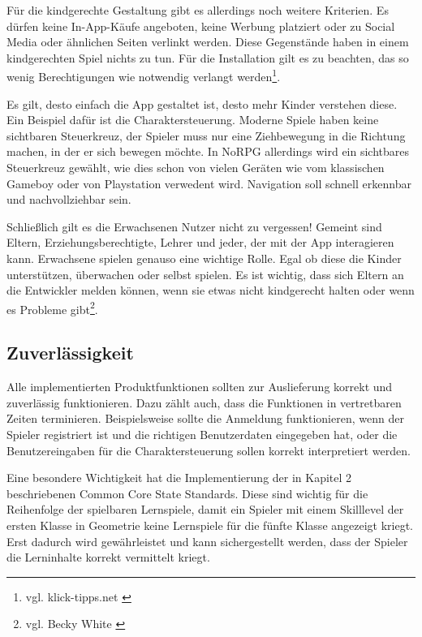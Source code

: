 		Für die kindgerechte Gestaltung gibt es allerdings noch weitere Kriterien. Es dürfen keine In-App-Käufe angeboten, keine Werbung platziert oder zu Social Media oder ähnlichen Seiten verlinkt werden. Diese Gegenstände haben in einem kindgerechten Spiel nichts zu tun. Für die Installation gilt es zu beachten, das so wenig Berechtigungen wie notwendig verlangt werden\footnote{vgl. klick-tipps.net \cite{appsforkids}}.
		
		Es gilt, desto einfach die App gestaltet ist, desto mehr Kinder verstehen diese. Ein Beispiel dafür ist die Charaktersteuerung. Moderne Spiele haben keine sichtbaren Steuerkreuz, der Spieler muss nur eine Ziehbewegung in die Richtung machen, in der er sich bewegen möchte. In NoRPG allerdings wird ein sichtbares Steuerkreuz gewählt, wie dies schon von vielen Geräten wie vom klassischen Gameboy oder von Playstation verwedent wird. Navigation soll schnell erkennbar und nachvollziehbar sein.
		
		Schließlich gilt es die Erwachsenen Nutzer nicht zu vergessen! Gemeint sind Eltern, Erziehungsberechtigte, Lehrer und jeder, der mit der App interagieren kann. Erwachsene spielen genauso eine wichtige Rolle. Egal ob diese die Kinder unterstützen, überwachen oder selbst spielen. Es ist wichtig, dass sich Eltern an die Entwickler melden können, wenn sie etwas nicht kindgerecht halten oder wenn es Probleme gibt\footnote{vgl. Becky White \cite{smashMagazin}}.	

	\subsection{Zuverlässigkeit}
		Alle implementierten Produktfunktionen sollten zur Auslieferung korrekt und zuverlässig funktionieren. Dazu zählt auch, dass die Funktionen in vertretbaren Zeiten terminieren. Beispielsweise sollte die Anmeldung funktionieren, wenn der Spieler registriert ist und die richtigen Benutzerdaten eingegeben hat, oder die Benutzereingaben für die Charaktersteuerung sollen korrekt interpretiert werden.
		
		Eine besondere Wichtigkeit hat die Implementierung der in Kapitel 2 beschriebenen Common Core State Standards. Diese sind wichtig für die Reihenfolge der spielbaren Lernspiele, damit ein Spieler mit einem Skilllevel der ersten Klasse in Geometrie keine Lernspiele für die fünfte Klasse angezeigt kriegt. Erst dadurch wird gewährleistet und kann sichergestellt werden, dass der Spieler die Lerninhalte korrekt vermittelt kriegt.
	
